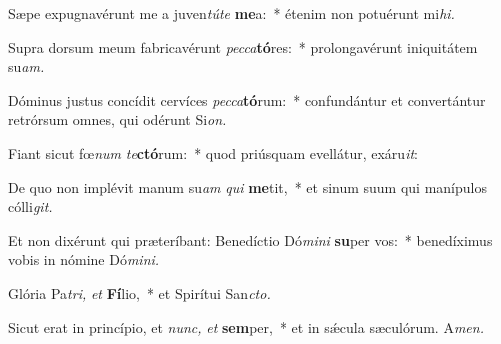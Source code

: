 \item Sæpe expugnavérunt me a juven\textit{túte} \textbf{me}a:~* étenim non potuérunt mi\textit{hi.}
\item Supra dorsum meum fabricavérunt \textit{pecca}\textbf{tó}res:~* prolongavérunt iniquitátem su\textit{am.}
\item Dóminus justus concídit cervíces \textit{pecca}\textbf{tó}rum:~* confundántur et convertántur retrórsum omnes, qui odérunt Si\textit{on.}
\item Fiant sicut fœ\textit{num} \textit{te}\textbf{ctó}rum:~* quod priúsquam evellátur, exáru\textit{it}:
\item De quo non implévit manum su\tinyhspace\textit{am} \textit{qui} \textbf{me}tit,~* et sinum suum qui manípulos cólli\tinyhspace\textit{git.}
\item Et non dixérunt qui præteríbant: Benedíctio Dó\textit{mini} \textbf{su}per vos:~* benedíximus vobis in nómine  Dó\textit{mini.}
\item Glória  Pa\tinyhspace\textit{tri,} \textit{et} \textbf{Fí}lio,~* et Spirítui San\tinyhspace\textit{cto.}
\item Sicut erat in princípio, et \textit{nunc,} \textit{et} \textbf{sem}per,~* et in sǽcula sæculórum. A\textit{men.}